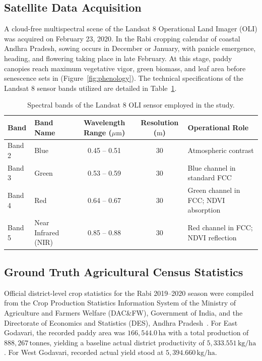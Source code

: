 \documentclass[11pt,a4paper]{article}
\begin{document}
\subsection{Satellite Data Acquisition}
A cloud-free multispectral scene of the Landsat 8 Operational Land Imager (OLI) was acquired on February 23, 2020. In the Rabi cropping calendar of coastal Andhra Pradesh, sowing occurs in December or January, with panicle emergence, heading, and flowering taking place in late February. At this stage, paddy canopies reach maximum vegetative vigor, green biomass, and leaf area before senescence sets in (Figure~\ref{fig:phenology}). The technical specifications of the Landsat 8 sensor bands utilized are detailed in Table~\ref{tab:bands}.

\begin{table}[H]
\centering
\caption{Spectral bands of the Landsat 8 OLI sensor employed in the study.}
\label{tab:bands}
\small
\begin{tabularx}{\textwidth}{llccX}
\toprule
\textbf{Band} & \textbf{Band Name} & \textbf{Wavelength Range ($\mu\text{m}$)} & \textbf{Resolution ($\text{m}$)} & \textbf{Operational Role} \\
\midrule
Band 2 & Blue & 0.45 -- 0.51 & 30 & Atmospheric contrast \\
Band 3 & Green & 0.53 -- 0.59 & 30 & Blue channel in standard FCC \\
Band 4 & Red & 0.64 -- 0.67 & 30 & Green channel in FCC; NDVI absorption \\
Band 5 & Near Infrared (NIR) & 0.85 -- 0.88 & 30 & Red channel in FCC; NDVI reflection \\
\bottomrule
\end{tabularx}
\end{table}

\subsection{Ground Truth Agricultural Census Statistics}
Official district-level crop statistics for the Rabi 2019--2020 season were compiled from the Crop Production Statistics Information System of the Ministry of Agriculture and Farmers Welfare (DAC\&FW), Government of India, and the Directorate of Economics and Statistics (DES), Andhra Pradesh~\cite{desap2020rabi}. For East Godavari, the recorded paddy area was $166,544.0\,\text{ha}$ with a total production of $888,267\,\text{tonnes}$, yielding a baseline actual district productivity of $5,333.551\,\text{kg/ha}$. For West Godavari, recorded actual yield stood at $5,394.660\,\text{kg/ha}$.
\end{document}
